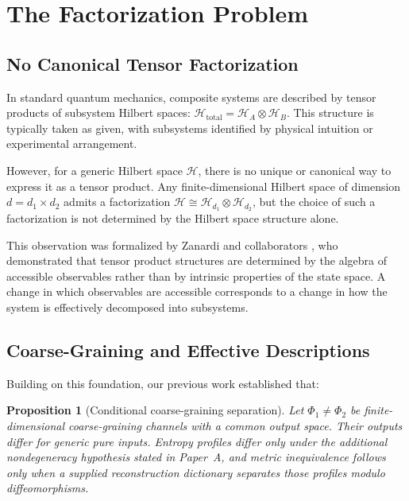 \documentclass[12pt,a4paper,openany]{book}
\newtheorem{proposition}[theorem]{Proposition}
\begin{document}
\section{The Factorization Problem}
\label{H-D-sec:factorization}

\subsection{No Canonical Tensor Factorization}

In standard quantum mechanics, composite systems are described by tensor products of subsystem Hilbert spaces: $\mathcal{H}_{\text{total}} = \mathcal{H}_A \otimes \mathcal{H}_B$. This structure is typically taken as given, with subsystems identified by physical intuition or experimental arrangement.

However, for a generic Hilbert space $\mathcal{H}$, there is no unique or canonical way to express it as a tensor product. Any finite-dimensional Hilbert space of dimension $d = d_1 \times d_2$ admits a factorization $\mathcal{H} \cong \mathcal{H}_{d_1} \otimes \mathcal{H}_{d_2}$, but the choice of such a factorization is not determined by the Hilbert space structure alone.

This observation was formalized by Zanardi and collaborators \cite{Zanardi2001,Zanardi2004}, who demonstrated that tensor product structures are determined by the algebra of accessible observables rather than by intrinsic properties of the state space. A change in which observables are accessible corresponds to a change in how the system is effectively decomposed into subsystems.

\subsection{Coarse-Graining and Effective Descriptions}

Building on this foundation, our previous work \cite{Liu2026PaperA} established that:

\begin{proposition}[Conditional coarse-graining separation]
\label{H-D-prop:inequiv}
Let $\Phi_1\ne\Phi_2$ be finite-dimensional coarse-graining channels with a common output space.  Their outputs differ for generic pure inputs.  Entropy profiles differ only under the additional nondegeneracy hypothesis stated in Paper~A, and metric inequivalence follows only when a supplied reconstruction dictionary separates those profiles modulo diffeomorphisms.
\end{proposition}
\end{document}
